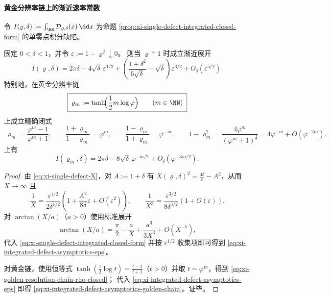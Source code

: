 \paragraph{黄金分辨率链上的渐近速率常数}
令
\(
I(\varrho,\delta):=\int_{\RR}\mathcal{D}_{\varrho,\delta}(x)\,\dd x
\)
为命题 \ref{prop:xi-single-defect-integrated-closed-form} 的单零点积分缺陷。

\begin{proposition}\label{prop:xi-integrated-defect-golden-asymptotics}
固定 \(0<\delta<1\)，并令 \(\varepsilon:=1-\varrho^2\downarrow 0\)。
则当 \(\varrho\uparrow 1\) 时成立渐近展开
\begin{equation}\label{eq:xi-integrated-defect-asymptotics-eps}
\boxed{\;
I(\varrho,\delta)
=2\pi\delta
-4\sqrt{\delta}\,\varepsilon^{1/2}
+\left(\frac{1+\delta^2}{6\sqrt{\delta}}-\sqrt{\delta}\right)\varepsilon^{3/2}
+O_\delta(\varepsilon^{5/2}).\;}
\end{equation}
特别地，在黄金分辨率链
\begin{equation}\label{eq:xi-golden-resolution-chain-rho}
\boxed{\;\varrho_m:=\tanh\!\Bigl(\frac12 m\log\varphi\Bigr)\qquad(m\in\NN)\;}
\end{equation}
上成立精确闭式
\begin{equation}\label{eq:xi-golden-resolution-chain-rho-closed}
\boxed{\;
\varrho_m=\frac{\varphi^m-1}{\varphi^m+1},
\qquad
\frac{1+\varrho_m}{1-\varrho_m}=\varphi^m,
\qquad
\frac{1-\varrho_m}{1+\varrho_m}=\varphi^{-m},
\qquad
1-\varrho_m^2=\frac{4\varphi^m}{(\varphi^m+1)^2}
=4\varphi^{-m}+O(\varphi^{-2m}).\;}
\end{equation}
上有
\begin{equation}\label{eq:xi-integrated-defect-asymptotics-golden-chain}
\boxed{\;
I(\varrho_m,\delta)
=2\pi\delta
-8\sqrt{\delta}\,\varphi^{-m/2}
+O_\delta(\varphi^{-3m/2}).\;}
\end{equation}
\end{proposition}

\begin{proof}
由 \eqref{eq:xi-single-defect-X}，对 \(A:=1+\delta\) 有
\(
X(\varrho,\delta)^2=\frac{4\delta}{\varepsilon}-A^2
\)，从而 \(X\to\infty\) 且
\[
\frac{1}{X}
=\frac{\varepsilon^{1/2}}{2\delta^{1/2}}
\left(1+\frac{A^2}{8\delta}\varepsilon+O(\varepsilon^2)\right),
\qquad
\frac{1}{X^3}
=\frac{\varepsilon^{3/2}}{8\delta^{3/2}}
\left(1+O(\varepsilon)\right).
\]
对 \(\arctan(X/a)\)（\(a>0\)）使用标准展开
\[
\arctan(X/a)=\frac{\pi}{2}-\frac{a}{X}+\frac{a^3}{3X^3}+O(X^{-5}),
\]
代入 \eqref{eq:xi-single-defect-integrated-closed-form} 并按 \(\varepsilon^{1/2}\) 收集项即可得到 \eqref{eq:xi-integrated-defect-asymptotics-eps}。
\par
对黄金链，使用恒等式 \(\tanh(\tfrac12\log t)=\frac{t-1}{t+1}\)（\(t>0\)）并取 \(t=\varphi^m\)，得到 \eqref{eq:xi-golden-resolution-chain-rho-closed}；
代入 \eqref{eq:xi-integrated-defect-asymptotics-eps} 即得 \eqref{eq:xi-integrated-defect-asymptotics-golden-chain}。证毕。
\end{proof}


